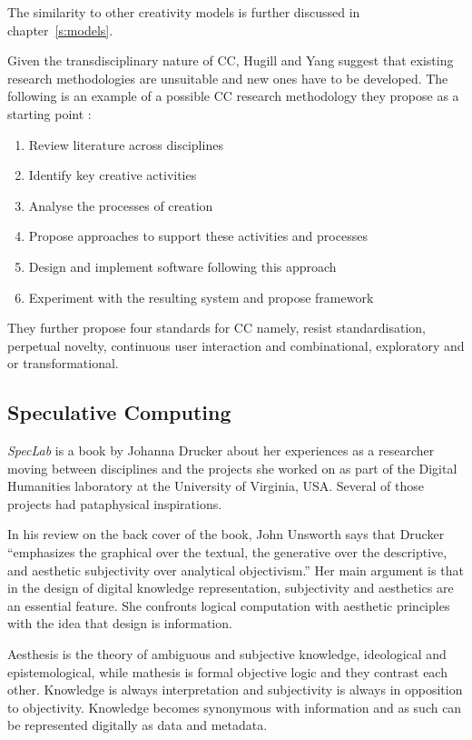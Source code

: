 The similarity to other creativity models is further discussed in chapter~\ref{s:models}.

Given the transdisciplinary nature of \ac{CC}, Hugill and Yang suggest that existing research methodologies are unsuitable and new ones have to be developed. The following is an example of a possible \ac{CC} research methodology they propose as a starting point \autocite[p.17]{Hugill2013c}:

\begin{enumerate}
  \item Review literature across disciplines
  \item Identify key creative activities
  \item Analyse the processes of creation
  \item Propose approaches to support these activities and processes
  \item Design and implement software following this approach
  \item Experiment with the resulting system and propose framework
\end{enumerate}

They further propose four standards for \ac{CC} \citeyear[p.17]{Hugill2013c} namely, resist standardisation, perpetual novelty, continuous user interaction and combinational, exploratory and or transformational.


\subsection{Speculative Computing}
\label{s:speccomp}

\textit{SpecLab} is a book by Johanna Drucker \citeyear{Drucker2009} about her experiences as a researcher moving between disciplines and the projects she worked on as part of the Digital Humanities laboratory at the University of Virginia, USA\@. Several of those projects had pataphysical inspirations.

In his review on the back cover of the book, John Unsworth says that Drucker ``emphasizes the graphical over the textual, the generative over the descriptive, and aesthetic subjectivity over analytical objectivism.'' Her main argument is that in the design of digital knowledge representation, subjectivity and aesthetics are an essential feature. She confronts logical computation with aesthetic principles with the idea that design is information.

Aesthesis is the theory of ambiguous and subjective knowledge, ideological and epistemological, while mathesis is formal objective logic and they contrast each other. Knowledge is always interpretation and subjectivity is always in opposition to objectivity. Knowledge becomes synonymous with information and as such can be represented digitally as data and metadata.

